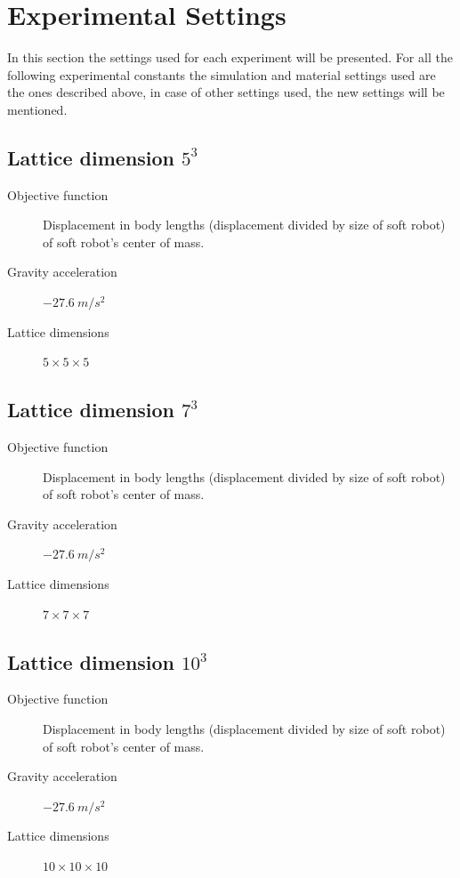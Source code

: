 \chapter{Experimental Settings} %
\label{ExperimentalSettings} %


In this section the settings used for each experiment will be presented. For all the following experimental constants the simulation and material settings used are the ones described above, in case of other settings used, the new settings will be mentioned.
\section{Lattice dimension $5^3$}
\label{Settings-size5}
\begin{small}
\begin{description}
\item[Objective function]{Displacement in body lengths (displacement divided by size of soft robot) of soft robot's center of mass.}
\item[Gravity acceleration]{$-27.6\ m/s^2$}
\item[Lattice dimensions]{$5 \times 5 \times 5$}
\end{description}
\end{small}

\section{Lattice dimension $7^3$}
\label{Settings-size7}
\begin{small}
\begin{description}
\item[Objective function]{Displacement in body lengths (displacement divided by size of soft robot) of soft robot's center of mass.}
\item[Gravity acceleration]{$-27.6\ m/s^2$}
\item[Lattice dimensions]{$7 \times 7 \times 7$}
\end{description}
\end{small}

\section{Lattice dimension $10^3$}
\label{Settings-size10}
\begin{small}
\begin{description}
\item[Objective function]{Displacement in body lengths (displacement divided by size of soft robot) of soft robot's center of mass.}
\item[Gravity acceleration]{$-27.6\ m/s^2$}
\item[Lattice dimensions]{$10 \times 10 \times 10$}
\end{description}
\end{small}

